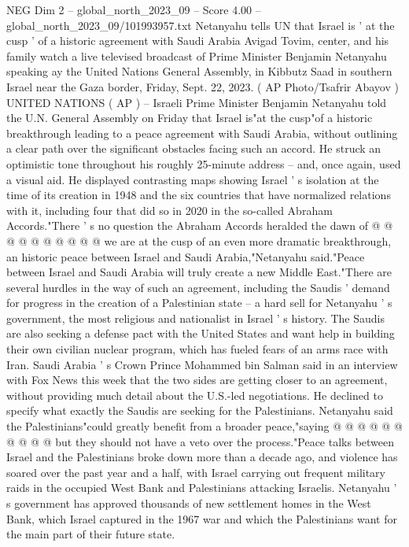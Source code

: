 \begin{textsample}{NEG Dim 2 – global\_north\_2023\_09 – Score 4.00 – global\_north\_2023\_09/101993957.txt}  \label{ex:f2_neg_312}
Netanyahu tells UN that Israel is ' at the cusp ' of a historic agreement with Saudi Arabia Avigad Tovim, center, and his family watch a live televised broadcast of Prime Minister Benjamin Netanyahu speaking ay the United Nations General Assembly, in Kibbutz Saad in southern Israel near the Gaza border, Friday, Sept. 22, 2023. ( AP Photo/Tsafrir Abayov ) UNITED NATIONS ( AP ) -- Israeli Prime Minister Benjamin Netanyahu told the U.N.
General Assembly on Friday that Israel is"at the cusp"of a historic breakthrough leading to a peace agreement with Saudi Arabia, without outlining a clear path over the significant obstacles facing such an accord.
He struck an optimistic tone throughout his roughly 25-minute address -- and, once again, used a visual aid.
He displayed contrasting maps showing Israel ' s isolation at the time of its creation in 1948 and the six countries that have normalized relations with it, including four that did so in 2020 in the so-called Abraham Accords."There ' s no question the Abraham Accords heralded the dawn of @ @ @ @ @ @ @ @ @ @ we are at the cusp of an even more dramatic breakthrough, an historic peace between Israel and Saudi Arabia,"Netanyahu said."Peace between Israel and Saudi Arabia will truly create a new Middle East."There are several hurdles in the way of such an agreement, including the Saudis ' demand for progress in the creation of a Palestinian state -- a hard sell for Netanyahu ' s government, the most religious and nationalist in Israel ' s history.
The Saudis are also seeking a defense pact with the United States and want help in building their own civilian nuclear program, which has fueled fears of an arms race with Iran.
Saudi Arabia ' s Crown Prince Mohammed bin Salman said in an interview with Fox News this week that the two sides are getting closer to an agreement, without providing much detail about the U.S.-led negotiations.
He declined to specify what exactly the Saudis are seeking for the Palestinians.
Netanyahu said the Palestinians"could greatly benefit from a broader peace,"saying @ @ @ @ @ @ @ @ @ @ but they should not have a veto over the process."Peace talks between Israel and the Palestinians broke down more than a decade ago, and violence has soared over the past year and a half, with Israel carrying out frequent military raids in the occupied West Bank and Palestinians attacking Israelis.
Netanyahu ' s government has approved thousands of new settlement homes in the West Bank, which Israel captured in the 1967 war and which the Palestinians want for the main part of their future state.

\end{textsample}
